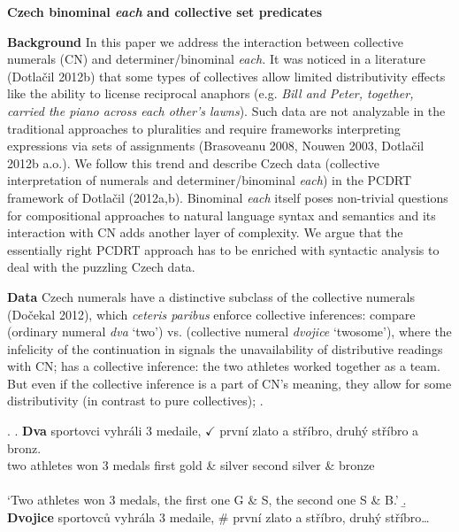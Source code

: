 \documentclass[12pt, a4paper]{scrartcl}
\begin{document}
\setlength{\Exlabelsep}{0.3em}
\setlength{\SubExleftmargin}{1.3em}
\setlength{\parindent}{0cm} %


\begin{center}
\textbf{Czech binominal \textit{each} and collective set predicates}
\end{center}

\noindent\textbf{Background} In this paper we address the interaction between collective numerals (CN) and de\-ter\-mi\-ner/bi\-no\-mi\-nal \textit{each.} It was noticed in a literature (Dotlačil 2012b) that some types of collectives allow limited distributivity effects like the ability to license reciprocal anaphors (e.g. \textit{Bill and Peter, together, carried the piano across each other's lawns}). Such data are not analyzable in the traditional approaches to pluralities and require frameworks interpreting expressions via sets of assignments (Brasoveanu 2008, Nouwen 2003, Dotlačil 2012b a.o.). We follow this trend and describe Czech data (collective interpretation of numerals and determiner/binominal \textit{each}) in the PCDRT framework of Dotlačil (2012a,b). Binominal \textit{each} itself poses non-trivial questions for compositional approaches to natural language syntax and semantics and its interaction with CN adds another layer of complexity. We argue that the essentially right PCDRT approach has to be enriched with syntactic analysis  to deal with the puzzling Czech data.

\noindent\textbf{Data} Czech numerals have a distinctive subclass of the collective numerals (Dočekal 2012), which \textit{ceteris paribus} enforce collective inferences: compare \Next[a] (ordinary numeral \textit{dva} `two') vs. \Next[b] (collective numeral \textit{dvojice} `twosome'), where the infelicity of the continuation in \Next[b] signals the unavailability of distributive readings with CN; \Next[b] has a collective inference: the two athletes worked together as a team. But even if the collective inference is a part of CN's meaning, they allow for some distributivity  (in contrast to pure collectives); \NNext.\vspace{-4pt}

\ex. \ag. \textbf{Dva} sportovci vyhráli 3 medaile, $\checkmark$\hspace{-3pt} první zlato a stříbro, druhý stříbro a bronz.\\
two athletes won 3 medals {} first gold \& silver second silver \& bronze\\ \\
`Two athletes won 3 medals, the first one G \& S, the second one S \& B.'
\b. \textbf{Dvojice} sportovců vyhrála 3 medaile, {\#}\hspace{-2pt} první zlato a stříbro, druhý stříbro\ldots
\end{document}
